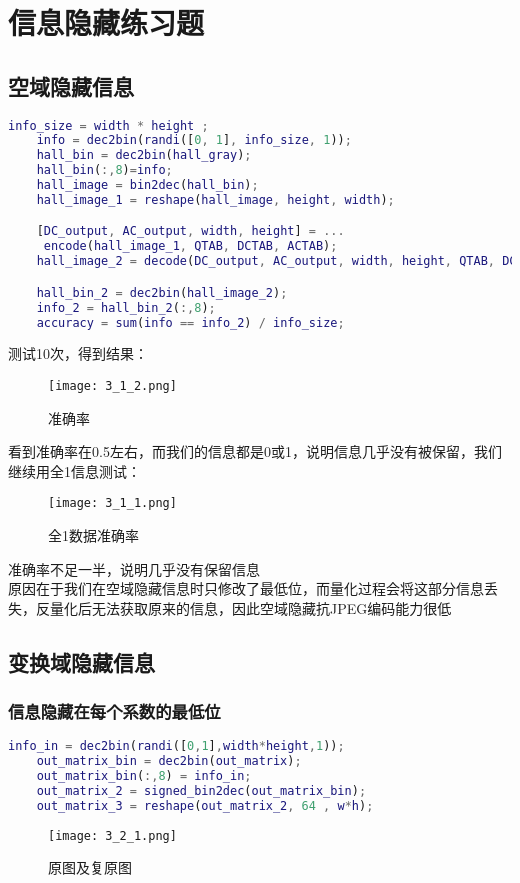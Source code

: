 \documentclass[12pt]{article}
\begin{document}
\section{信息隐藏练习题}
\subsection{空域隐藏信息}

\begin{lstlisting}[language=matlab]
    info_size = width * height ;
    info = dec2bin(randi([0, 1], info_size, 1));
    hall_bin = dec2bin(hall_gray);
    hall_bin(:,8)=info;
    hall_image = bin2dec(hall_bin);
    hall_image_1 = reshape(hall_image, height, width);

    [DC_output, AC_output, width, height] = ... 
     encode(hall_image_1, QTAB, DCTAB, ACTAB);
    hall_image_2 = decode(DC_output, AC_output, width, height, QTAB, DCTAB, ACTAB);

    hall_bin_2 = dec2bin(hall_image_2);
    info_2 = hall_bin_2(:,8);
    accuracy = sum(info == info_2) / info_size;
\end{lstlisting}

测试10次，得到结果：
\begin{figure}[H]
    \centering
    \texttt{[image: 3\_1\_2.png]}
    \caption{准确率}
\end{figure}
看到准确率在0.5左右，而我们的信息都是0或1，说明信息几乎没有被保留，我们继续用全1信息测试：
\begin{figure}[H]
    \centering
    \texttt{[image: 3\_1\_1.png]}
    \caption{全1数据准确率}
\end{figure}
准确率不足一半，说明几乎没有保留信息\\
\hspace*{2em}原因在于我们在空域隐藏信息时只修改了最低位，而量化过程会将这部分信息丢失，反量化后无法获取原来的信息，因此空域隐藏抗JPEG编码能力很低

\subsection{变换域隐藏信息}
\subsubsection{信息隐藏在每个系数的最低位}

\begin{lstlisting}[language=matlab]
    info_in = dec2bin(randi([0,1],width*height,1));
    out_matrix_bin = dec2bin(out_matrix);
    out_matrix_bin(:,8) = info_in;
    out_matrix_2 = signed_bin2dec(out_matrix_bin);
    out_matrix_3 = reshape(out_matrix_2, 64 , w*h);
\end{lstlisting}
\begin{figure}[H]
    \centering
    \texttt{[image: 3\_2\_1.png]}
    \caption{原图及复原图}
\end{figure}
\end{document}
